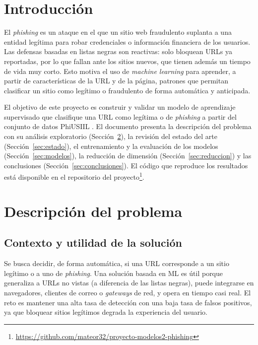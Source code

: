 \documentclass[journal]{IEEEtran}
\begin{document}
\section{Introducción}
El \textit{phishing} es un ataque en el que un sitio web fraudulento suplanta a una entidad
legítima para robar credenciales o información financiera de los usuarios. Las defensas
basadas en listas negras son reactivas: solo bloquean URLs ya reportadas, por lo que fallan
ante los sitios nuevos, que tienen además un tiempo de vida muy corto. Esto motiva el uso de
\textit{machine learning} para aprender, a partir de características de la URL y de la página,
patrones que permitan clasificar un sitio como legítimo o fraudulento de forma automática y
anticipada.

El objetivo de este proyecto es construir y validar un modelo de aprendizaje supervisado que
clasifique una URL como legítima o de \textit{phishing} a partir del conjunto de datos
PhiUSIIL \cite{prasad2024}. El documento presenta la descripción del problema con su análisis
exploratorio (Sección~\ref{sec:problema}), la revisión del estado del arte
(Sección~\ref{sec:estado}), el entrenamiento y la evaluación de los modelos
(Sección~\ref{sec:modelos}), la reducción de dimensión (Sección~\ref{sec:reduccion}) y las
conclusiones (Sección~\ref{sec:conclusiones}). El código que reproduce los resultados
está disponible en el repositorio del proyecto\footnote{\url{https://github.com/mateor32/proyecto-modelos2-phishing}}.

\section{Descripción del problema}
\label{sec:problema}

\subsection{Contexto y utilidad de la solución}
Se busca decidir, de forma automática, si una URL corresponde a un sitio legítimo o a uno de
\textit{phishing}. Una solución basada en ML es útil porque generaliza a URLs no vistas (a
diferencia de las listas negras), puede integrarse en navegadores, clientes de correo o
\textit{gateways} de red, y opera en tiempo casi real. El reto es mantener una alta tasa de
detección con una baja tasa de falsos positivos, ya que bloquear sitios legítimos degrada la
experiencia del usuario.
\end{document}
